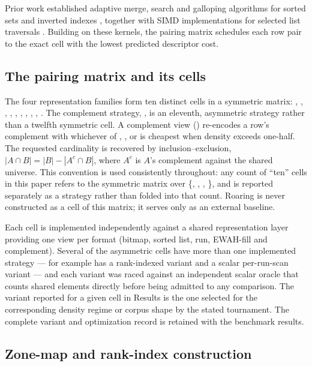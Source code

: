 Prior work established adaptive merge, search and galloping algorithms for sorted sets and inverted
indexes \cite{demaine2000adaptive,culpepper2010intersection,ding2011intersection}, together with
SIMD implementations for selected list traversals
\cite{inoue2014simdintersection,lemire2016simdintersection}. Building on these kernels, the pairing
matrix schedules each row pair to the exact cell with the lowest predicted descriptor cost.

\subsection*{The pairing matrix and its cells}

The four representation families form ten distinct cells in a symmetric matrix:
\cell{\rB}{\rB}, \cell{\rB}{\rS},
\cell{\rB}{\rR}, \cell{\rB}{\rW}, \cell{\rS}{\rS}, \cell{\rS}{\rR}, \cell{\rS}{\rW}, \cell{\rR}{\rR},
\cell{\rR}{\rW}, \cell{\rW}{\rW}. The complement strategy, \cell{\rC}{\rB}, is an eleventh, asymmetric
strategy rather than a twelfth symmetric cell. A complement view (\rC) re-encodes a row's complement
with whichever of \rB{}, \rS{}, \rR{} or \rW{} is cheapest when density exceeds one-half. The requested
cardinality is recovered by inclusion--exclusion,
$|A \cap B| = |B| - |A^{c} \cap B|$, where $A^{c}$ is $A$'s complement against the shared universe.
This convention is used consistently throughout: any count of ``ten'' cells in this paper refers to
the symmetric matrix over \{\rB, \rS, \rR, \rW\}, and \cell{\rC}{\rB} is reported separately as a
strategy rather than folded into that count. Roaring is never constructed as a cell of this matrix;
it serves only as an external baseline.

Each cell is implemented independently against a shared representation layer providing one view per
format (bitmap, sorted list, run, EWAH-fill and complement). Several of the asymmetric cells have more
than one implemented strategy --- for example \cell{\rB}{\rR} has a rank-indexed variant and a scalar
per-run-scan variant --- and each variant was raced against an independent scalar oracle that counts
shared elements directly before being admitted to any comparison. The variant reported for a given cell in Results is the one
selected for the corresponding density regime or corpus shape by the stated tournament. The complete
variant and optimization record is retained with the benchmark results.

\subsection*{Zone-map and rank-index construction}

